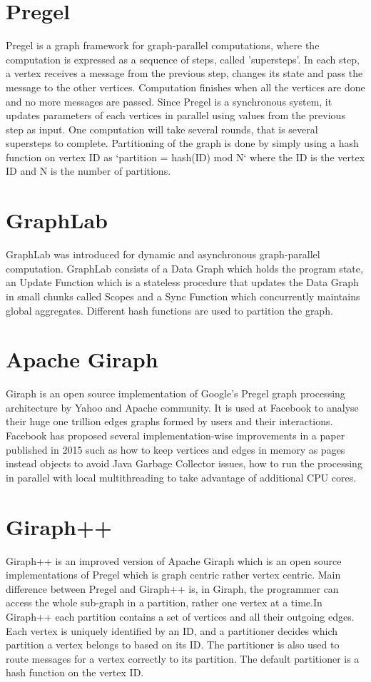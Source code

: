 \section{Pregel}
Pregel\cite{Pregel} is a graph framework for graph-parallel computations, where the computation is expressed as a sequence of steps, called ’supersteps’. In each step, a vertex receives a message from the previous step, changes its state and pass the message to the other vertices. Computation finishes when all the vertices are done and no more messages are passed. Since Pregel is a synchronous system, it updates parameters of each vertices in parallel using values from the previous step as input. One computation will take several rounds, that is several supersteps to complete. Partitioning of the graph is done by simply using a hash function on vertex ID as `partition = hash(ID) mod N` where the ID is the vertex ID and N is the number of partitions. 
 
\section{GraphLab}
GraphLab\cite{Graphlab} was introduced for dynamic and asynchronous graph-parallel computation. GraphLab consists of a Data Graph which holds the program state, an Update Function which is a stateless procedure that updates the Data Graph in small chunks called Scopes and a Sync Function which concurrently maintains global aggregates. Different hash functions are used to partition the graph. 


\section{Apache Giraph}
Giraph is an open source implementation of Google’s Pregel\cite{Pregel} graph processing architecture by Yahoo and Apache community. It is used at Facebook to analyse their huge one trillion edges graphs\cite{Facebook} formed by users and their interactions. Facebook has proposed several implementation-wise improvements in a paper\cite{Facebook}  published in 2015 such as how to keep vertices and edges in memory as pages instead objects to avoid Java Garbage Collector issues, how to run the processing in parallel with local multithreading to take advantage of additional CPU cores.
 
\section{Giraph++}
Giraph++\cite{GiraphPlusPlus} is an improved version of Apache Giraph which is an open source  implementations of Pregel which is graph centric rather vertex centric. Main difference between Pregel and Giraph++ is, in Giraph, the programmer can access the whole sub-graph in a partition, rather one vertex at a time.In Giraph++ each partition contains a set of vertices and all their outgoing edges. Each vertex is uniquely identified by an ID, and a partitioner decides which partition a vertex belongs to based on its ID. The partitioner is also used to route messages for a vertex correctly to its partition. The default partitioner is a hash function on the vertex ID.

